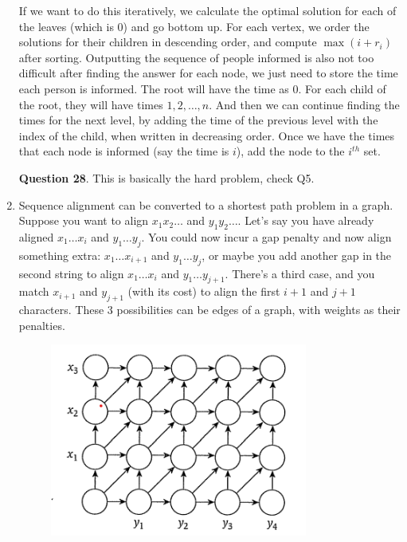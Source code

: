 \documentclass[12pt]{report}
\begin{document}
\begin{enumerate}[label=\textbf{\arabic*.}]
  If we want to do this iteratively, we calculate the optimal solution for each of the leaves (which is 0) and go bottom up. For each vertex, we order the solutions for their children in descending order, and compute $\max(i + r_i)$
  after sorting. Outputting the sequence of people informed is also not too difficult after finding the answer for each node, we just need to store the time each person is informed. The root will have the time as 0. For each child
  of the root, they will have times $1, 2, \dots, n$. And then we can continue finding the times for the next level, by adding the time of the previous level with the index of the child, when written in decreasing order. Once we have the
  times that each node is informed (say the time is $i$), add the node to the $i^{th}$ set.

  \textbf{Question 28}. This is basically the hard problem, check Q5.
 
  \item Sequence alignment can be converted to a shortest path problem in a graph. Suppose you want to align $x_1 x_2 \dots$ and $y_1 y_2 \dots$. Let's say you have already aligned $x_1 \dots x_i$ and $y_1 \dots y_j$. You could
  now incur a gap penalty and now align something extra: $x_1 \dots x_{i+1}$ and $y_1 \dots y_j$, or maybe you add another gap in the second string to align $x_1 \dots x_i$ and $y_1 \dots y_{j+1}$. There's a third case, and you match
  $x_{i+1}$ and $y_{j+1}$ (with its cost) to align the first $i+1$ and $j+1$ characters. These 3 possibilities can be edges of a graph, with weights as their penalties.

  \begin{figure}[H]
    \centering
    \includegraphics[width=0.8\textwidth]{SeqAlignGraph.png}  
  \end{figure}


\end{enumerate}
\end{document}
